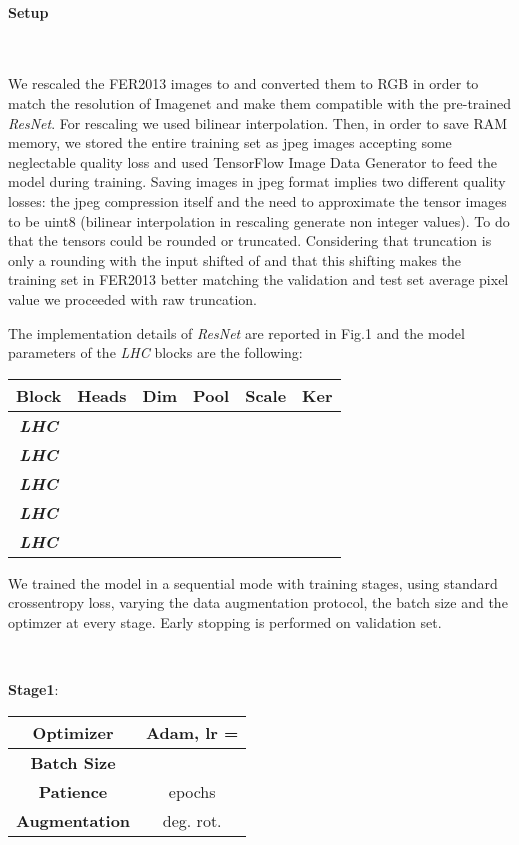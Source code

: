 \documentclass[fleqn,10pt]{SelfArx}
\begin{document}
\paragraph{Setup}

\

We rescaled the FER2013 images to  and converted them to RGB in order to match the resolution of Imagenet and make them compatible with the pre-trained \textit{ResNet}. For rescaling we used bilinear interpolation.
Then, in order to save RAM memory, we stored the entire training set as jpeg images accepting some neglectable quality loss and used TensorFlow Image Data Generator to feed the model during training. Saving images in jpeg format implies two different quality losses: the jpeg compression itself and the need to approximate the tensor images to be uint8 (bilinear interpolation in rescaling generate non integer values). To do that the tensors could be rounded or truncated. Considering that truncation is only a rounding with the input shifted of  and that this shifting makes the training set in FER2013 better matching the validation and test set average pixel value we proceeded with raw truncation.

The implementation details of \textit{ResNet} are reported in Fig.1 and the model parameters of the  \textit{LHC} blocks are the following:
\begin{center}
\begin{tabular}{||c | c | c | c | c | c||}  
 \hline
 \textbf{Block}  & \textbf{Heads} & \textbf{Dim} & \textbf{Pool} & \textbf{Scale} & \textbf{Ker}\\ 
 \hline
 \hline
\textbf{\textit{LHC}} &  &  &  & & \\
 \hline
 \hline
\textbf{\textit{LHC}} &  &  &  & & \\
 \hline
 \hline
\textbf{\textit{LHC}} &  &  &  & & \\
 \hline
 \hline
\textbf{\textit{LHC}} &  &  &  & & \\
 \hline
 \hline
\textbf{\textit{LHC}} &  &  &  & & \\
 \hline
\end{tabular}
\end{center}

We trained the model in a sequential mode with  training stages, using standard crossentropy loss, varying the data augmentation protocol, the batch size and the optimzer at every stage. Early stopping is performed on validation set.

\

\textbf{Stage1}:
\begin{center}
\begin{tabular}{||c c||}  
 \hline
 \textbf{Optimizer} & Adam, lr =  \\ 
 \hline
 \textbf{Batch Size} &  \\
 \hline
 \textbf{Patience} &  epochs \\
 \hline
 \textbf{Augmentation} &  deg. rot. \\
 \hline
\end{tabular}
\end{center}
\end{document}
